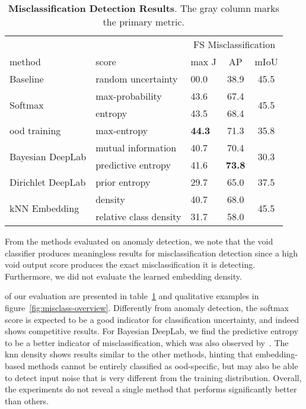 \begin{table}[ht]
    \centering
    \scriptsize{
    \setlength\tabcolsep{4pt}
    \begin{tabular}{ll|mcc}
    \toprule
    & & \multicolumn{3}{c}{FS Misclassification}\\
    
    method & score & max J & AP & mIoU\\
    \toprule
    Baseline & random uncertainty & 00.0 & 38.9 & 45.5 \\
    \midrule
    \multirow{2}{*}{Softmax}
        & max-probability & 43.6 & 67.4 & \multirow{2}{*}{45.5} \\
        & entropy  & 43.5 & 68.4 &\\
    \midrule
    \ac{ood} training & max-entropy & \textbf{44.3} & 71.3  & 35.8 \\
    \midrule
    \multirow{2}{*}{Bayesian DeepLab}
        & mutual information & 40.7 & 70.4  & \multirow{2}{*}{30.3}\\
        & predictive entropy  & 41.6 & \textbf{73.8} &\\
    \midrule
    Dirichlet DeepLab
        & prior entropy & 29.7 & 65.0 & 37.5 \\
    \midrule
    \multirow{2}{*}{\parbox[b]{8em}{kNN Embedding}}
        & density  & 40.7 & 68.0 & \multirow{2}{*}{45.5}\\
        & relative class density  & 31.7 & 58.0 & \\
    \bottomrule
    \end{tabular}
    }
    \vspace{5pt}
    \caption{\textbf{Misclassification Detection Results}. The gray column marks the primary metric.
    }
    \label{tab:misclassification_results}
    \vspace{-3mm}
\end{table}

 From the methods evaluated on anomaly detection, we note that the void classifier produces meaningless results for misclassification detection since a high void output score produces the exact misclassification it is detecting. Furthermore, we did not evaluate the learned embedding density.

 of our evaluation are presented in table~\ref{tab:misclassification_results} and qualitative examples in figure~\ref{fig:misclass-overview}. Differently from anomaly detection, the softmax score is expected to be a good indicator for classification uncertainty, and indeed shows competitive results. For Bayesian DeepLab, we find the predictive entropy to be a better indicator of misclassification, which was also observed by~\cite{Kendall2017-jy}.
The k\ac{nn} density shows results similar to the other methods, hinting that embedding-based methods cannot be entirely classified as \ac{ood}-specific, but may also be able to detect input noise that is very different from the training distribution. Overall, the experiments do not reveal a single method that performs significantly better than others.

